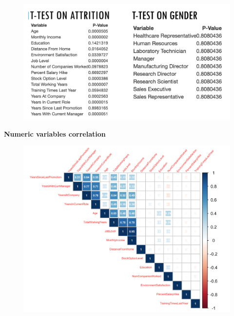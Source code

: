 \documentclass[notes,11pt]{beamer}
\begin{document}

\begin{frame}

\begin{figure}
\includegraphics[scale=0.25]{PIC7}
\end{figure}


\end{frame}



\begin{frame}
\begin{center}
\textbf{\color{blue}\Large{Numeric variables correlation}}
\end{center}\medskip
\begin{figure}
\includegraphics[scale=0.40]{PIC8}
\end{figure}


\end{frame}
\end{document}
